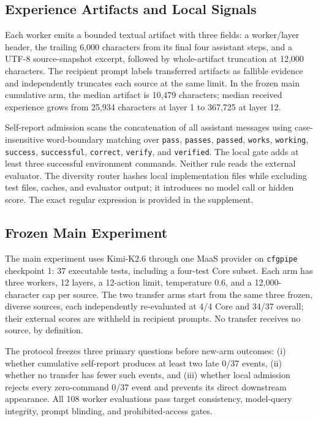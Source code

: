 \documentclass[letterpaper]{article}
\begin{document}
\subsection{Experience Artifacts and Local Signals}

Each worker emits a bounded textual artifact with three fields: a worker/layer
header, the trailing 6,000 characters from its final four assistant steps, and a
UTF-8 source-snapshot excerpt, followed by whole-artifact truncation at 12,000
characters. The recipient prompt labels transferred artifacts as fallible evidence
and independently truncates each source at the same limit. In the frozen main
cumulative arm, the median artifact is 10,479 characters; median received
experience grows from 25,934 characters at layer 1 to 367,725 at layer 12.

Self-report admission scans the concatenation of all assistant messages using
case-insensitive word-boundary matching over \texttt{pass}, \texttt{passes},
\texttt{passed}, \texttt{works}, \texttt{working}, \texttt{success},
\texttt{successful}, \texttt{correct}, \texttt{verify}, and \texttt{verified}.
The local gate adds at least three successful environment commands. Neither rule
reads the external evaluator. The diversity router hashes local implementation
files while excluding test files, caches, and evaluator output; it introduces no
model call or hidden score. The exact regular expression is provided in the
supplement.

\subsection{Frozen Main Experiment}

The main experiment uses Kimi-K2.6 through one MaaS provider on
\texttt{cfgpipe} checkpoint 1: 37 executable tests, including a four-test Core
subset. Each arm has three workers, 12 layers, a 12-action limit, temperature
0.6, and a 12,000-character cap per source. The two transfer arms start from the
same three frozen, diverse sources, each independently re-evaluated at 4/4 Core
and 34/37 overall; their external scores are withheld in recipient prompts. No
transfer receives no source, by definition.

The protocol freezes three primary questions before new-arm outcomes:
(i) whether cumulative self-report produces at least two late 0/37 events,
(ii) whether no transfer has fewer such events, and
(iii) whether local admission rejects every zero-command 0/37 event and prevents
its direct downstream appearance. All 108 worker evaluations pass target
consistency, model-query integrity, prompt blinding, and prohibited-access gates.
\end{document}
